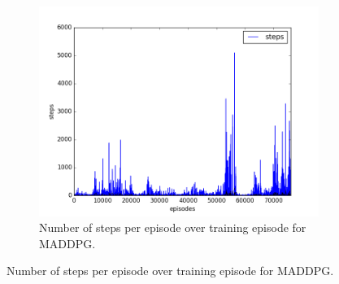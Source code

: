 \begin{figure}[h]
\begin{subfigure}[h]{\figscale\linewidth}
  \end{subfigure}
  ~
  \begin{subfigure}[h]{\figscale\linewidth}
    \includegraphics[trim=10 10 10 10,clip,width=\linewidth]
    {../results/maddpg_1vs1/steps.png}
    \caption{Number of steps per episode over training episode for MADDPG.}
    \label{fig:maddpg-1vs1-steps}
  \end{subfigure}


\end{figure}
